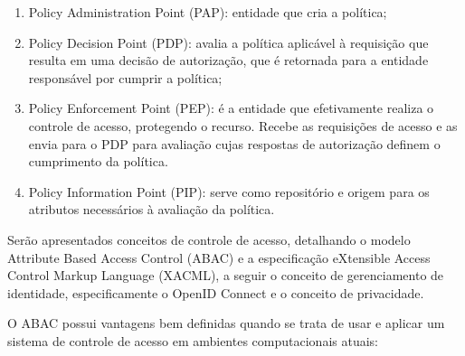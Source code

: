 \documentclass{doublecol-new}
\begin{document}
\begin{enumerate}
	\item Policy Administration Point (PAP): entidade que cria a política;
	\item Policy Decision Point (PDP): avalia a política aplicável à requisição que resulta em uma decisão de autorização, que é retornada para a entidade responsável por cumprir a política;
	\item Policy Enforcement Point (PEP): é a entidade que efetivamente realiza o controle de acesso, protegendo o recurso. Recebe as requisições de acesso e as envia para o PDP para avaliação cujas respostas de autorização definem o cumprimento da política.
	\item Policy Information Point (PIP): serve como repositório e origem para os atributos necessários à avaliação da política.
\end{enumerate}


Serão apresentados conceitos de controle de acesso, detalhando o modelo Attribute Based Access Control (ABAC)\cite{huABAC2014guide} e a especificação eXtensible Access Control Markup Language (XACML)\cite{rissanen2013extensible}, a seguir o conceito de gerenciamento de identidade, especificamente o OpenID Connect e o conceito de privacidade.


O ABAC possui vantagens bem definidas quando se trata de usar e aplicar um sistema de controle de acesso em ambientes computacionais atuais: 
\end{document}
